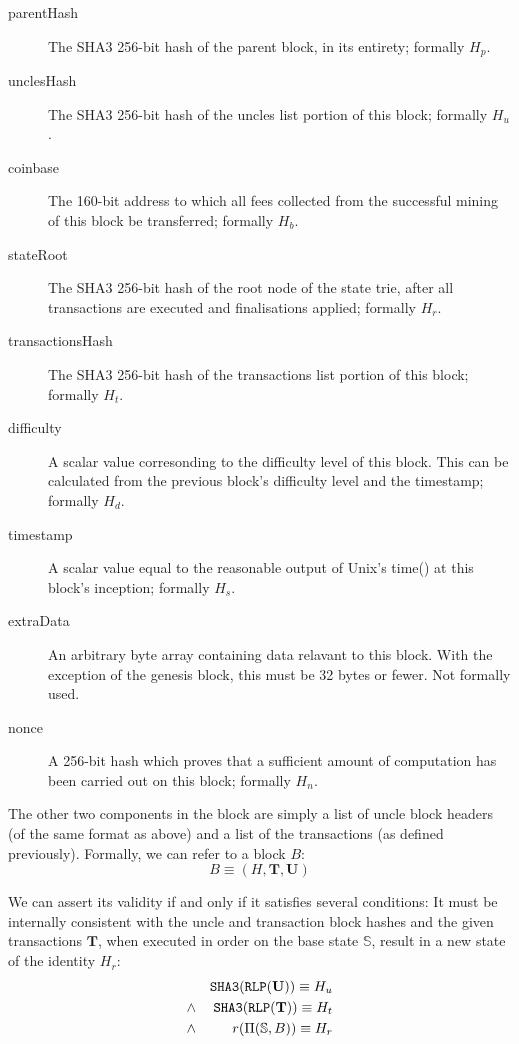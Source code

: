 \documentclass[9pt,oneside]{amsart}
\begin{document}
\begin{multicols}{2}
\begin{description}
\item[parentHash] The SHA3 256-bit hash of the parent block, in its entirety; formally $H_p$.
\item[unclesHash] The SHA3 256-bit hash of the uncles list portion of this block; formally $H_u$.
\item[coinbase] The 160-bit address to which all fees collected from the successful mining of this block be transferred; formally $H_b$.
\item[stateRoot] The SHA3 256-bit hash of the root node of the state trie, after all transactions are executed and finalisations applied; formally $H_r$.
\item[transactionsHash] The SHA3 256-bit hash of the transactions list portion of this block; formally $H_t$.
\item[difficulty] A scalar value corresonding to the difficulty level of this block. This can be calculated from the previous block's difficulty level and the timestamp; formally $H_d$.
\item[timestamp] A scalar value equal to the reasonable output of Unix's time() at this block's inception; formally $H_s$.
\item[extraData] An arbitrary byte array containing data relavant to this block. With the exception of the genesis block, this must be 32 bytes or fewer. Not formally used.
\item[nonce] A 256-bit hash which proves that a sufficient amount of computation has been carried out on this block; formally $H_n$.
\end{description}

The other two components in the block are simply a list of uncle block headers (of the same format as above) and a list of the transactions (as defined previously). Formally, we can refer to a block $B$:
\begin{equation}
B \equiv (H, \mathbf{T}, \mathbf{U})
\end{equation}

We can assert its validity if and only if it satisfies several conditions: It must be internally consistent with the uncle and transaction block hashes and the given transactions $\mathbf{T}$, when executed in order on the base state $\mathbb{S}$, result in a new state of the identity $H_r$:
\begin{eqnarray}
& & \mathtt{\tiny SHA3}(\mathtt{\tiny RLP}(\mathbf{U})) \equiv H_u \\
& \wedge & \mathtt{\tiny SHA3}(\mathtt{\tiny RLP}(\mathbf{T})) \equiv H_t \\
& \wedge & r(\Pi(\mathbb{S}, B)) \equiv H_r
\end{eqnarray}


\end{multicols}
\end{document}

